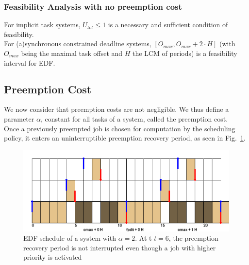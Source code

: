 \documentclass[a4paper,10pt]{article}
\begin{document}
        \subsubsection{Feasibility Analysis with no preemption cost}


        For implicit task systems, $U_{tot} \leqslant 1$ is a necessary and sufficient condition of feasibility.\\

        For (a)synchronous constrained deadline systems, $[O_{max}, O_{max} + 2 \cdot H]$ (with $O_{max}$ being the maximal task offset and $H$ the LCM of periods) is a feasibility interval for EDF.

    \subsection{Preemption Cost}


        We now consider that preemption costs are not negligible. We thus define a parameter $\alpha$, constant for all tasks of a system, called the preemption cost.\\

        Once a previously preempted job is chosen for computation by the scheduling policy, it enters an uninterruptible preemption recovery period, as seen in Fig.~\ref{fig:prp}.\\

        \begin{figure}[H]
        \begin{center}
            \includegraphics[width=\textwidth]{figs/atomicpreemption_example.png}
            \caption{EDF schedule of a system with $\alpha=2$. At t $t=6$, the preemption recovery period is not interrupted even though a job with higher priority is activated}
            \label{fig:prp}
        \end{center}
        \end{figure}
\end{document}
